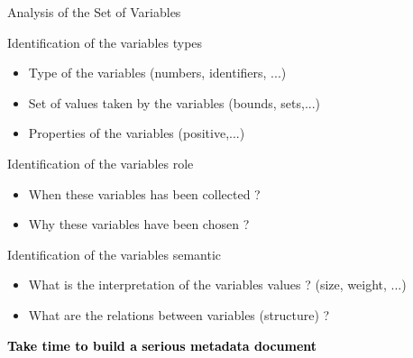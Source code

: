 \documentclass[xcolor=x11names,compress,8pt,
handout
]{beamer}
\renewcommand{\(}{\begin{columns}}
\renewcommand{\)}{\end{columns}}
\newcommand{\<}[1]{\begin{column}{#1}}
\renewcommand{\>}{\end{column}}
\begin{document}
\begin{frame}{Analysis of  the Set of  Variables}
\begin{alertblock}{Identification of the variables types}
\begin{itemize}
\item Type of the variables (numbers, identifiers, ...)
\item Set of values taken by the variables (bounds, sets,...)
\item Properties of the variables (positive,...)
\end{itemize}
\end{alertblock}
\pause
\begin{alertblock}{Identification of the variables role}
\begin{itemize}
\item When these variables has been collected ?
\item Why these variables have been chosen ?
\end{itemize}
\end{alertblock}
\pause
\begin{alertblock}{Identification of the variables semantic}
\begin{itemize}
\item What is the interpretation of the variables values ? (size, weight, ...)
\item What are the relations between variables (structure) ?
\end{itemize}
\end{alertblock}
\vfill 

\centerline{\colorbox{yellow!85}{\textcolor{black}{\textbf{\large Take time to build a serious metadata document}}}}

\end{frame}
\end{document}
